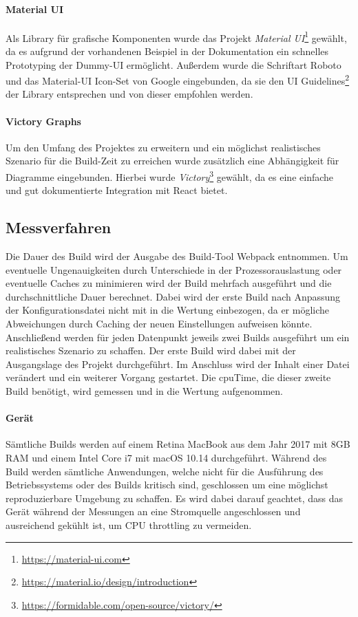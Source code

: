 \documentclass[11pt]{report}
\begin{document}
				\paragraph{Material UI} Als Library für grafische Komponenten wurde das Projekt \emph{Material UI}\footnote{\url{https://material-ui.com}} gewählt, da es aufgrund der vorhandenen Beispiel in der Dokumentation ein schnelles Prototyping der Dummy-UI ermöglicht. Außerdem wurde die Schriftart Roboto und das Material-UI Icon-Set von Google eingebunden, da sie den UI Guidelines\footnote{\url{https://material.io/design/introduction}} der Library entsprechen und von dieser empfohlen werden.

				\paragraph{Victory Graphs} Um den Umfang des Projektes zu erweitern und ein möglichst realistisches Szenario für die Build-Zeit zu erreichen wurde zusätzlich eine Abhängigkeit für Diagramme eingebunden. Hierbei wurde \emph{Victory}\footnote{\url{https://formidable.com/open-source/victory/}} gewählt, da es eine einfache und gut dokumentierte Integration mit React bietet.

			\subsection{Messverfahren}
				Die Dauer des Build wird der Ausgabe des Build-Tool Webpack entnommen. Um eventuelle Ungenauigkeiten durch Unterschiede in der Prozessorauslastung oder eventuelle Caches zu minimieren wird der Build mehrfach ausgeführt und die durchschnittliche Dauer berechnet. Dabei wird der erste Build nach Anpassung der Konfigurationsdatei nicht mit in die Wertung einbezogen, da er mögliche Abweichungen durch Caching der neuen Einstellungen aufweisen könnte. Anschließend werden für jeden Datenpunkt jeweils zwei Builds ausgeführt um ein realistisches Szenario zu schaffen. Der erste Build wird dabei mit der Ausgangslage des Projekt durchgeführt. Im Anschluss wird der Inhalt einer Datei verändert und ein weiterer Vorgang gestartet. Die \Gls{cpuTime}, die dieser zweite Build benötigt, wird gemessen und in die Wertung aufgenommen.
	
				\paragraph{Gerät} Sämtliche Builds werden auf einem Retina MacBook aus dem Jahr 2017 mit 8GB RAM und einem Intel Core i7 mit macOS 10.14 durchgeführt. Während des Build werden sämtliche Anwendungen, welche nicht für die Ausführung des Betriebssystems oder des Builds kritisch sind, geschlossen um eine möglichst reproduzierbare Umgebung zu schaffen. Es wird dabei darauf geachtet, dass das Gerät während der Messungen an eine Stromquelle angeschlossen und ausreichend gekühlt ist, um CPU throttling zu vermeiden.
\end{document}
